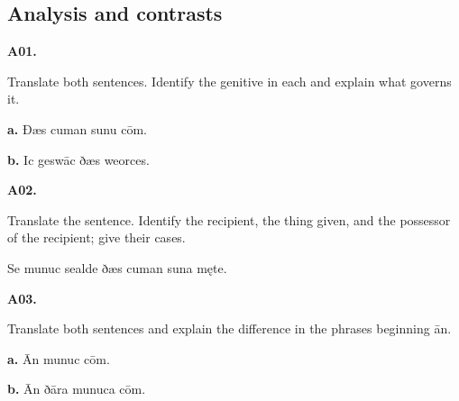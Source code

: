 \subsection*{Analysis and contrasts}

\par\begin{minipage}{\linewidth}\raggedright
\textbf{A01.}

Translate both sentences. Identify the genitive in each and explain what governs it.

\textbf{a.} Ðæs cuman sunu cōm.

\textbf{b.} Ic geswāc ðæs weorces.

\end{minipage}\par\addvspace{4pt}

\par\begin{minipage}{\linewidth}\raggedright
\textbf{A02.}

Translate the sentence. Identify the recipient, the thing given, and the possessor of the recipient; give their cases.

Se munuc sealde ðæs cuman suna męte.

\end{minipage}\par\addvspace{4pt}

\par\begin{minipage}{\linewidth}\raggedright
\textbf{A03.}

Translate both sentences and explain the difference in the phrases beginning ān.

\textbf{a.} Ān munuc cōm.

\textbf{b.} Ān ðāra munuca cōm.

\end{minipage}\par\addvspace{4pt}


